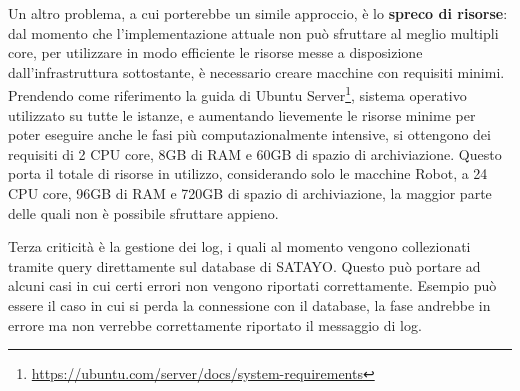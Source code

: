 Un altro problema, a cui porterebbe un simile approccio, è lo \textbf{spreco di
risorse}: dal momento che l'implementazione attuale non può sfruttare al meglio
multipli core, per utilizzare in modo efficiente le risorse messe a disposizione
dall'infrastruttura sottostante, è necessario creare macchine con requisiti
minimi. Prendendo come riferimento la guida di Ubuntu Server\footnote{\url{https://ubuntu.com/server/docs/system-requirements}},
sistema operativo utilizzato su tutte le istanze, e aumentando lievemente le
risorse minime per poter eseguire anche le fasi più computazionalmente intensive,
si ottengono dei requisiti di 2 CPU core, 8GB di RAM e 60GB di spazio di
archiviazione. Questo porta il totale di risorse in utilizzo, considerando solo
le macchine Robot, a 24 CPU core, 96GB di RAM e 720GB di spazio di archiviazione,
la maggior parte delle quali non è possibile sfruttare appieno.

Terza criticità è la gestione dei log, i quali al momento vengono collezionati
tramite query direttamente sul database di SATAYO. Questo può portare ad alcuni casi
in cui certi errori non vengono riportati correttamente. Esempio può essere il
caso in cui si perda la connessione con il database, la fase andrebbe in errore ma
non verrebbe correttamente riportato il messaggio di log.